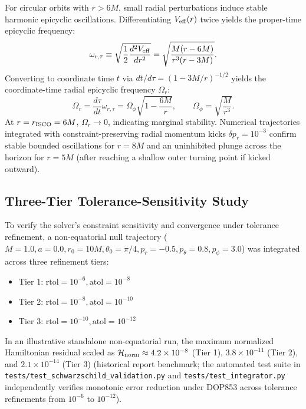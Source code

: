 For circular orbits with $r > 6M$, small radial perturbations induce stable harmonic epicyclic oscillations. Differentiating $V_{\rm eff}(r)$ twice yields the proper-time epicyclic frequency:
\begin{equation}
    \omega_{r,\tau} \equiv \sqrt{\frac{1}{2}\frac{d^2 V_{\rm eff}}{dr^2}} = \sqrt{\frac{M(r - 6M)}{r^3(r - 3M)}}.
    \label{eq:schwarzschild_proper_epicyclic_freq}
\end{equation}
Converting to coordinate time $t$ via $dt/d\tau = \left(1 - 3M/r\right)^{-1/2}$ yields the coordinate-time radial epicyclic frequency $\Omega_r$:
\begin{equation}
    \Omega_r = \frac{d\tau}{dt}\omega_{r,\tau} = \Omega_\phi \sqrt{1 - \frac{6M}{r}}, \qquad \Omega_\phi = \sqrt{\frac{M}{r^3}}.
    \label{eq:schwarzschild_epicyclic_freq}
\end{equation}
At $r = r_{\rm ISCO} = 6M$, $\Omega_r \to 0$, indicating marginal stability. Numerical trajectories integrated with constraint-preserving radial momentum kicks $\delta p_r = 10^{-3}$ confirm stable bounded oscillations for $r = 8M$ and an uninhibited plunge across the horizon for $r = 5M$ (after reaching a shallow outer turning point if kicked outward).

\subsection{Three-Tier Tolerance-Sensitivity Study}
To verify the solver's constraint sensitivity and convergence under tolerance refinement, a non-equatorial null trajectory ($M = 1.0, a = 0.0, r_0 = 10M, \theta_0 = \pi/4, p_r = -0.5, p_\theta = 0.8, p_\phi = 3.0$) was integrated across three refinement tiers:
\begin{itemize}
    \item Tier 1: $\text{rtol} = 10^{-6}, \text{atol} = 10^{-8}$
    \item Tier 2: $\text{rtol} = 10^{-8}, \text{atol} = 10^{-10}$
    \item Tier 3: $\text{rtol} = 10^{-10}, \text{atol} = 10^{-12}$
\end{itemize}
In an illustrative standalone non-equatorial run, the maximum normalized Hamiltonian residual scaled as $\mathcal{H}_{\rm norm} \approx 4.2 \times 10^{-8}$ (Tier 1), $3.8 \times 10^{-11}$ (Tier 2), and $2.1 \times 10^{-14}$ (Tier 3) (historical report benchmark; the automated test suite in \texttt{tests/test\_schwarzschild\_validation.py} and \texttt{tests/test\_integrator.py} independently verifies monotonic error reduction under \textsc{DOP853} across tolerance refinements from $10^{-6}$ to $10^{-12}$).
